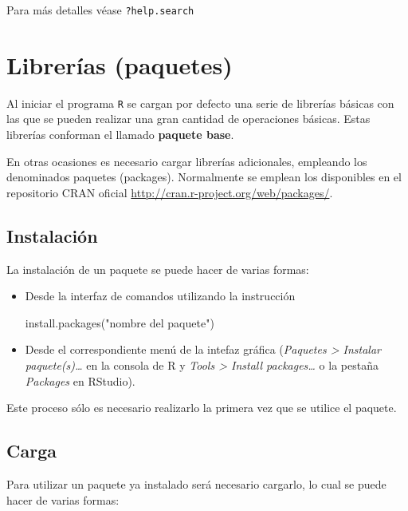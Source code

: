 \documentclass[
]{book}
\newenvironment{Shaded}{\begin{snugshade}}{\end{snugshade}}
\newcommand{\FunctionTok}[1]{\textcolor[rgb]{0.00,0.00,0.00}{#1}}
\newcommand{\NormalTok}[1]{#1}
\newcommand{\StringTok}[1]{\textcolor[rgb]{0.31,0.60,0.02}{#1}}
\theoremstyle{break}
\theoremstyle{nonumberplain}
\begin{document}
Para más detalles véase \texttt{?help.search}

\hypertarget{libreruxedas-paquetes}{%
\section{Librerías (paquetes)}\label{libreruxedas-paquetes}}

Al iniciar el programa \texttt{R} se cargan por defecto una serie de librerías básicas con las que se pueden realizar una gran cantidad de operaciones básicas.
Estas librerías conforman el llamado \textbf{paquete base}.

En otras ocasiones es necesario cargar librerías adicionales, empleando los denominados paquetes (packages).
Normalmente se emplean los disponibles en el repositorio CRAN oficial
\url{http://cran.r-project.org/web/packages/}.

\hypertarget{instalacion-pkg}{%
\subsection{Instalación}\label{instalacion-pkg}}

La instalación de un paquete se puede hacer de varias formas:

\begin{itemize}
\item
  Desde la interfaz de comandos utilizando la instrucción

\begin{Shaded}
\begin{Highlighting}[]
\FunctionTok{install.packages}\NormalTok{(}\StringTok{"nombre del paquete"}\NormalTok{)}
\end{Highlighting}
\end{Shaded}
\item
  Desde el correspondiente menú de la intefaz gráfica (\emph{Paquetes \textgreater{} Instalar paquete(s)\ldots{}} en la consola de R y \emph{Tools \textgreater{} Install packages\ldots{}} o la pestaña \emph{Packages} en RStudio).
\end{itemize}

Este proceso sólo es necesario realizarlo la primera vez que se utilice el paquete.

\hypertarget{carga}{%
\subsection{Carga}\label{carga}}

Para utilizar un paquete ya instalado será necesario cargarlo, lo cual se puede hacer de varias formas:
\end{document}

